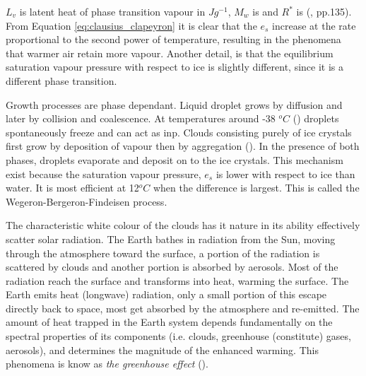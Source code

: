 $L_v$ is latent heat of phase transition vapour in $J g^{-1}$, $M_w$ is and $R^*$ is (\cite{cloud_phys_book_johanne}, pp.135). From Equation \eqref{eq:clausius_clapeyron} it is clear that the $e_s$ increase at the rate proportional to the second power of temperature, resulting in the phenomena that warmer air retain more vapour. Another detail, is that the equilibrium saturation vapour pressure with respect to ice is slightly different, since it is a different phase transition.


Growth processes are phase dependant. Liquid droplet grows by diffusion and later by collision and coalescence. At temperatures around -38 $^oC$ (\cite{lohmann2016}) droplets spontaneously freeze and can act as \acrshort{inp}. Clouds consisting purely of ice crystals first grow by deposition of vapour then by aggregation (\cite{Fowler1996LiquidAssumptions}). In the presence of both phases, droplets evaporate and deposit on to the ice crystals.
This mechanism exist because the saturation vapour pressure, $e_s$ is lower with respect to ice than water. It is most efficient at 12$^oC$ when the difference is largest. This is called the Wegeron-Bergeron-Findeisen process.

The characteristic white colour of the clouds has it nature in its ability effectively scatter solar radiation. %
The Earth bathes in radiation from the Sun, moving through the atmosphere toward the surface, a portion of the radiation is scattered by clouds and another portion is absorbed by aerosols. Most of the radiation reach the surface and transforms into heat, warming the surface. The Earth emits heat (longwave) radiation, only a small portion of this escape directly back to space, most get absorbed by the atmosphere and re-emitted. The amount of heat trapped in the Earth system depends fundamentally on the spectral properties of its components (i.e. clouds, greenhouse (constitute) gases, aerosols), and determines the magnitude of the enhanced warming. This phenomena is know as \textit{the greenhouse effect} (\cite{greenhouse_effect}). 

